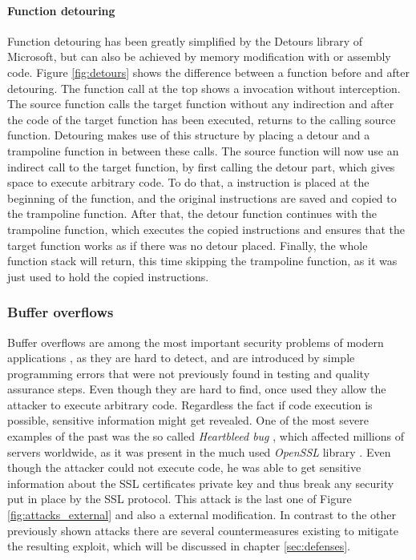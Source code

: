 \paragraph{Function detouring}

Function detouring has been greatly simplified by the Detours\cite{msdetours} library of Microsoft, but can also be achieved by memory modification with  or assembly code. Figure \ref{fig:detours} shows the difference between a function before and after detouring. The function call at the top shows a invocation without interception. The source function calls the target function without any indirection and after the code of the target function has been executed, returns to the calling source function. Detouring makes use of this structure by placing a detour and a trampoline function in between these calls. The source function will now use an indirect call to the target function, by first calling the detour part, which gives space to execute arbitrary code. To do that, a  instruction is placed at the beginning of the function, and the original instructions are saved and copied to the trampoline function. After that, the detour function continues with the trampoline function, which executes the copied instructions and ensures that the target function works as if there was no detour placed. Finally, the whole function stack will return, this time skipping the trampoline function, as it was just used to hold the copied instructions.

\subsubsection{Buffer overflows}
Buffer overflows are among the most important security problems of modern applications \cite{pethia}, as they are hard to detect, and are introduced by simple programming errors that were not previously found in testing and quality assurance steps. Even though they are hard to find, once used they allow the attacker to execute arbitrary code. Regardless the fact if code execution is possible, sensitive information might get revealed. One of the most severe examples of the past was the so called \emph{Heartbleed bug} \cite{durumeri}, which affected millions of servers worldwide, as it was present in the much used \emph{OpenSSL} library \cite{openssl}. Even though the attacker could not execute code, he was able to get sensitive information about the SSL certificates private key and thus break any security put in place by the SSL protocol. This attack is the last one of Figure \ref{fig:attacks_external} and also a external modification. In contrast to the other previously shown attacks there are several countermeasures existing to mitigate the resulting exploit, which will be discussed in chapter \ref{sec:defenses}.

